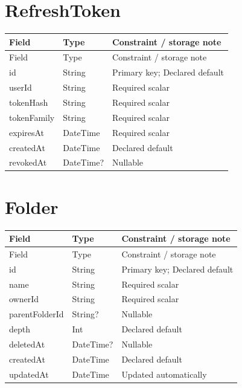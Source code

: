 \documentclass[11pt,a4paper,oneside]{report}
\begin{document}
\section{RefreshToken}
\begin{longtable}{p{.31\linewidth}p{.23\linewidth}p{.36\linewidth}}\toprule Field&Type&Constraint / storage note\\\midrule\endfirsthead\toprule Field&Type&Constraint / storage note\\\midrule\endhead
id&String&Primary key; Declared default\\
userId&String&Required scalar\\
tokenHash&String&Required scalar\\
tokenFamily&String&Required scalar\\
expiresAt&DateTime&Required scalar\\
createdAt&DateTime&Declared default\\
revokedAt&DateTime?&Nullable\\
\bottomrule\end{longtable}

\section{Folder}
\begin{longtable}{p{.31\linewidth}p{.23\linewidth}p{.36\linewidth}}\toprule Field&Type&Constraint / storage note\\\midrule\endfirsthead\toprule Field&Type&Constraint / storage note\\\midrule\endhead
id&String&Primary key; Declared default\\
name&String&Required scalar\\
ownerId&String&Required scalar\\
parentFolderId&String?&Nullable\\
depth&Int&Declared default\\
deletedAt&DateTime?&Nullable\\
createdAt&DateTime&Declared default\\
updatedAt&DateTime&Updated automatically\\
\bottomrule\end{longtable}
\end{document}
